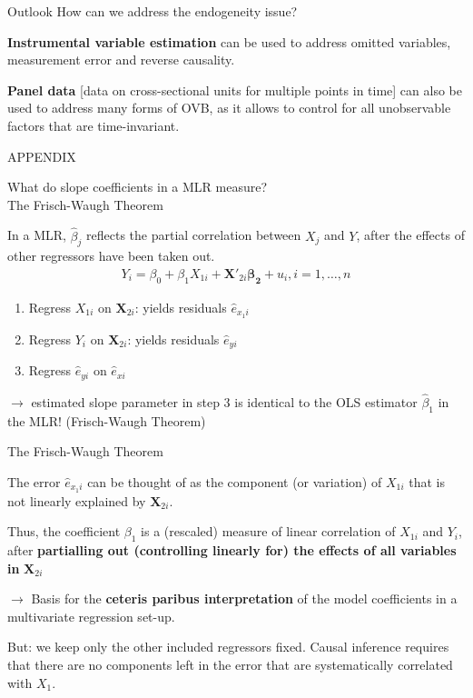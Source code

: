 \documentclass[11pt, aspectratio = 169]{beamer}
\begin{document}
\begin{frame}{Outlook}
How can we address the endogeneity issue?

\bigskip
\textbf{Instrumental variable estimation} can be used to address omitted variables, measurement error and reverse causality.

\bigskip 
\textbf{Panel data} [data on cross-sectional units for multiple points in time] can also be used to address many forms of OVB, as it allows to control for all unobservable factors that are time-invariant.

\end{frame}
\appendix
\begin{frame}

\Large \centering
APPENDIX
    
\end{frame}
\begin{frame}{What do slope coefficients in a MLR measure? \\
The Frisch-Waugh Theorem}

In a MLR, $\hat{\beta}_j$ reflects the partial correlation between $X_j$ and $Y$, after the effects of other regressors have been taken out. 
\begin{align*}
   Y_i =\beta _0 + \beta_1X_{1i} + \boldsymbol{X}'_{2i} \boldsymbol{\beta_2} + u_i , i = 1,…, n 
\end{align*}

\begin{enumerate}
    \item Regress $X_{1i}$ on  $\boldsymbol{X}_{2i} $: yields residuals $\hat{e}_{x_1i}$
    \item Regress $Y_i$ on  $\boldsymbol{X}_{2i}$: yields residuals $\hat{e}_{yi}$
    \item Regress $\hat{e}_{yi}$ on $\hat{e}_{xi}$
\end{enumerate}
$\rightarrow$ estimated slope parameter in step 3 is identical to the OLS estimator $\hat{\beta}_1$  in the MLR! (Frisch-Waugh Theorem)

\end{frame}

\begin{frame}{The Frisch-Waugh Theorem}

The error $\hat{e}_{x_1i}$ can be thought of as the component (or variation) of $X_{1i}$ that is not linearly explained by $\boldsymbol{X}_{2i} $.

Thus, the coefficient $\beta_1$ is a (rescaled) measure of linear correlation of $X_{1i}$ and $Y_i$, after \textbf{partialling out (controlling linearly for) the effects of all variables in}  $\boldsymbol{X}_{2i} $


$\rightarrow$ Basis for the \textbf{ceteris paribus interpretation} of the model coefficients in a multivariate regression set-up. 

But: we keep only the other included regressors fixed. Causal inference requires that there are no components left in the error that are systematically correlated with $X_1$.
\end{frame}
\end{document}

